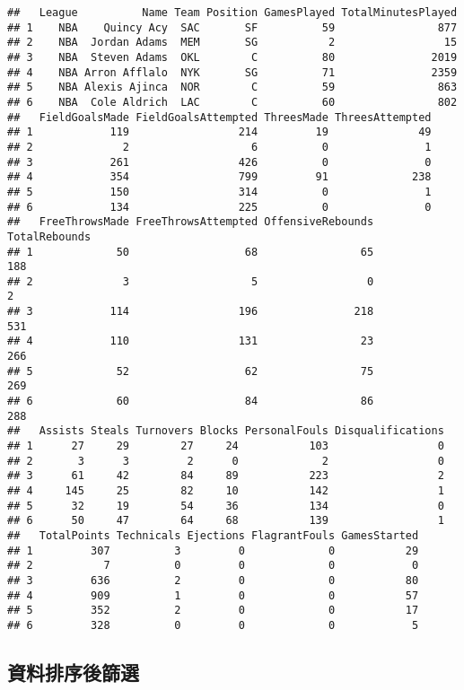 \documentclass[]{book}
\begin{document}
\begin{verbatim}
##   League          Name Team Position GamesPlayed TotalMinutesPlayed
## 1    NBA    Quincy Acy  SAC       SF          59                877
## 2    NBA  Jordan Adams  MEM       SG           2                 15
## 3    NBA  Steven Adams  OKL        C          80               2019
## 4    NBA Arron Afflalo  NYK       SG          71               2359
## 5    NBA Alexis Ajinca  NOR        C          59                863
## 6    NBA  Cole Aldrich  LAC        C          60                802
##   FieldGoalsMade FieldGoalsAttempted ThreesMade ThreesAttempted
## 1            119                 214         19              49
## 2              2                   6          0               1
## 3            261                 426          0               0
## 4            354                 799         91             238
## 5            150                 314          0               1
## 6            134                 225          0               0
##   FreeThrowsMade FreeThrowsAttempted OffensiveRebounds TotalRebounds
## 1             50                  68                65           188
## 2              3                   5                 0             2
## 3            114                 196               218           531
## 4            110                 131                23           266
## 5             52                  62                75           269
## 6             60                  84                86           288
##   Assists Steals Turnovers Blocks PersonalFouls Disqualifications
## 1      27     29        27     24           103                 0
## 2       3      3         2      0             2                 0
## 3      61     42        84     89           223                 2
## 4     145     25        82     10           142                 1
## 5      32     19        54     36           134                 0
## 6      50     47        64     68           139                 1
##   TotalPoints Technicals Ejections FlagrantFouls GamesStarted
## 1         307          3         0             0           29
## 2           7          0         0             0            0
## 3         636          2         0             0           80
## 4         909          1         0             0           57
## 5         352          2         0             0           17
## 6         328          0         0             0            5
\end{verbatim}

\subsection{資料排序後篩選}
\end{document}
